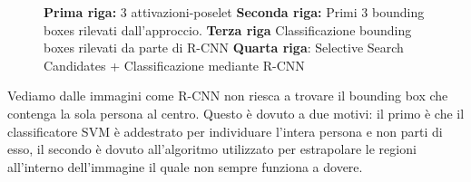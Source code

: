  
 \begin{figure}[h]
 \centering
 \hspace{5mm}
 \hspace{5mm}

 \hspace{5mm}
 \hspace{5mm}

 \newline
 \hspace{5mm}
 
 \hspace{5mm}
 \hspace{5mm}
\caption{\textbf{Prima riga:} 3 attivazioni-poselet \textbf{Seconda riga:} Primi 3 bounding boxes rilevati dall'approccio. \newline \textbf{Terza riga} Classificazione bounding boxes rilevati da parte di R-CNN\newline
 \textbf{Quarta riga}: Selective Search Candidates + Classificazione mediante R-CNN }
 \end{figure}
 
 Vediamo dalle immagini come R-CNN non riesca a trovare il bounding box che contenga la sola persona al centro. Questo è dovuto a due motivi: il primo è che il classificatore SVM è addestrato per individuare l'intera persona e non parti di esso, il secondo è dovuto all'algoritmo utilizzato per estrapolare le regioni all'interno dell'immagine il quale non sempre funziona a dovere.\\
 
